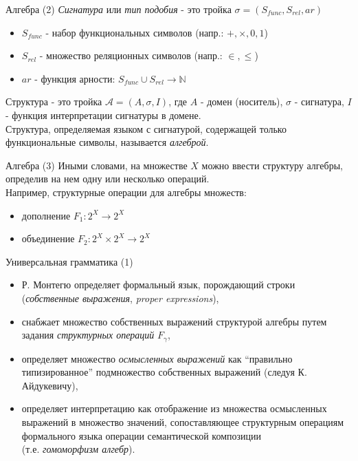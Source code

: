 \documentclass{beamer}
\begin{document}
\begin{frame}{Алгебра (2)}
\textit{Сигнатура} или \textit{тип подобия} - это тройка $\sigma = (S_{func}, S_{rel}, ar)$\\
\bigskip
\begin{itemize}
  \item $S_{func}$ - набор функциональных символов (напр.: $+, \times, 0, 1$)
  \item $S_{rel}$ - множество реляционных символов (напр.: $\in, \leq$)
  \item $ar$ - функция арности: $S_{func} \cup S_{rel} \to \mathbb{N}$
\end{itemize}
\bigskip
Структура - это тройка $\mathcal{A} = (A, \sigma, I)$, где $A$ - домен (носитель), $\sigma$ - сигнатура, $I$ - функция интерпретации сигнатуры в домене.\\
\bigskip
Структура, определяемая языком с сигнатурой, содержащей только функциональные символы, называется \textit{алгеброй}.
\end{frame}

\begin{frame}{Алгебра (3)}
Иными словами, на множестве $X$ можно ввести структуру алгебры, определив на нем одну или несколько операций.\\
\bigskip
Например, структурные операции для алгебры множеств:
\begin{itemize}
  \item дополнение $F_1 : 2^X \to 2^X$
  \item объединение $F_2 : 2^X \times 2^X \to 2^X$ 
\end{itemize}
\end{frame}

\begin{frame}{Универсальная грамматика (1)}
\begin{itemize}
  \item Р. Монтегю определяет формальный язык, порождающий строки (\textit{собственные выражения}, \textit{proper expressions}),
  \item снабжает множество собственных выражений структурой алгебры путем задания \textit{структурных операций} $F_\gamma$,
  \item определяет множество \textit{осмысленных выражений} как ``правильно типизированное'' подмножество собственных выражений (следуя К. Айдукевичу),
  \item определяет интерпретацию как отображение из множества осмысленных выражений в множество значений, сопоставляющее структурным операциям формального языка операции семантической композиции\\ (т.е. \textit{гомоморфизм алгебр}).
\end{itemize}
\end{frame}
\end{document}
